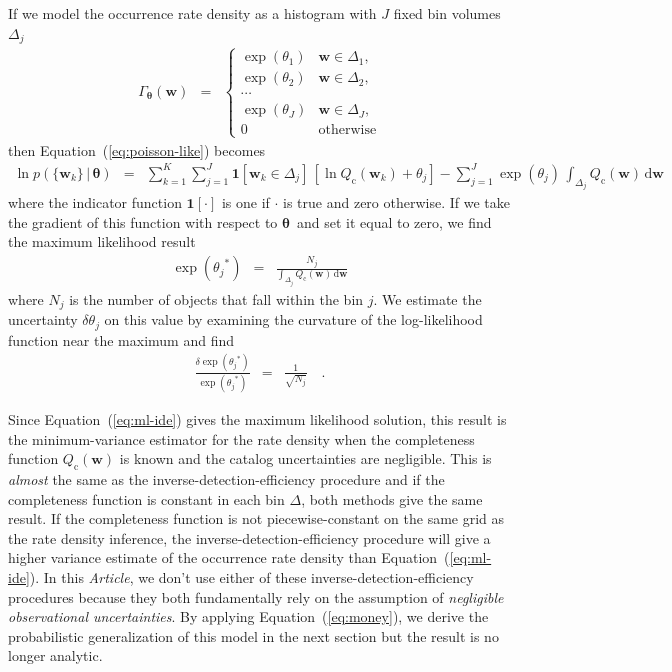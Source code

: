 \documentclass[12pt,preprint]{aastex}
\newcommand{\paper}{\textsl{Article}}
\newcommand{\Eq}[1]{Equation~(\ref{eq:#1})}
\newcommand{\eq}[1]{\Eq{#1}}
\newcommand{\eqlabel}[1]{\label{eq:#1}}
\newcommand{\dd}{\ensuremath{\,\mathrm{d}}}
\newcommand{\bvec}[1]{\ensuremath{\boldsymbol{#1}}}
\newcommand{\rate}{\ensuremath{\Gamma}}
\newcommand{\ratepar}{{\ensuremath{\theta}}}
\newcommand{\ratepars}{{\ensuremath{\bvec{\ratepar}}}}
\newcommand{\completeness}{{\ensuremath{Q_\mathrm{c}}}}
\newcommand{\entry}{{\ensuremath{\bvec{w}}}}
\newcommand{\binarea}{{\ensuremath{\Delta}}}
\begin{document}
If we model the occurrence rate density as a histogram with $J$ fixed bin
volumes $\binarea_j$
\begin{eqnarray}
\rate_\ratepars (\entry) &=& \left\{\begin{array}{ll}
\exp(\ratepar_1) & \entry \in \binarea_1,\\
\exp(\ratepar_2) & \entry \in \binarea_2,\\
\cdots \\
\exp(\ratepar_J) & \entry \in \binarea_J,\\
0 & \mathrm{otherwise}
\end{array}\right.
\end{eqnarray}
then \eq{poisson-like} becomes
\begin{eqnarray}
\ln p(\{\entry_k\}\,|\,\ratepars) &=&
    \sum_{k=1}^K \sum_{j=1}^J \mathbf{1}[\entry_k \in
        \binarea_j]\,[\ln\completeness(\entry_k)+\ratepar_j]
    -\sum_{j=1}^J\exp(\ratepar_j)\,
        \int_{\binarea_j} \completeness(\entry)\dd\entry
\end{eqnarray}
where the indicator function $\mathbf{1}[\cdot]$ is one if $\cdot$ is true and
zero otherwise.
If we take the gradient of this function with respect to \ratepars\ and set it
equal to zero, we find the maximum likelihood result
\begin{eqnarray}\eqlabel{ml-ide}
\exp ({\ratepar_j}^*) &=&
\frac{N_j}{\int_{\binarea_j} \completeness(\entry)\dd\entry}
\end{eqnarray}
where $N_j$ is the number of objects that fall within the bin $j$.
We estimate the uncertainty $\delta\ratepar_j$ on this value by examining the
curvature of the log-likelihood function near the maximum and find
\begin{eqnarray}
\frac{\delta\exp({\ratepar_j}^*)}{\exp({\ratepar_j}^*)} &=&
    \frac{1}{\sqrt{N_j}}
\quad.
\end{eqnarray}

Since \eq{ml-ide} gives the maximum likelihood solution, this result is the
minimum-variance estimator for the rate density when the completeness function
$\completeness(\entry)$ is known and the catalog uncertainties are negligible.
This is \emph{almost} the same as the inverse-detection-efficiency procedure
and if the completeness function is constant in each bin \binarea, both
methods give the same result.
If the completeness function is not piecewise-constant on the same grid as the
rate density inference, the inverse-detection-efficiency procedure will
give a higher variance estimate of the occurrence rate density than
\eq{ml-ide}.
In this \paper, we don't use either of these inverse-detection-efficiency
procedures because they both fundamentally rely on the assumption of
\emph{negligible observational uncertainties}.
By applying \eq{money}, we derive the probabilistic generalization of this
model in the next section but the result is no longer analytic.
\end{document}
